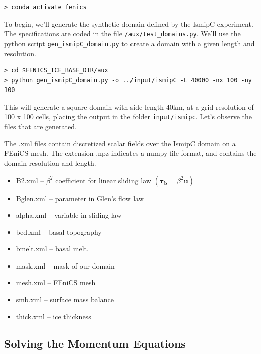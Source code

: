 \documentclass[11pt, reqno, nocenter]{article}
\begin{document}
\begin{verbatim}
> conda activate fenics 
\end{verbatim}

To begin, we'll generate the synthetic domain defined by the IsmipC experiment. The specifications are coded in the file {\tt /aux/test\_domains.py}. We'll use the python script {\tt gen\_ismipC\_domain.py} to create a domain with a given length and resolution.

\begin{verbatim}
> cd $FENICS_ICE_BASE_DIR/aux 
> python gen_ismipC_domain.py -o ../input/ismipC -L 40000 -nx 100 -ny 100 
\end{verbatim}

This will generate a square domain with side-length 40\si{\kilo\metre}, at a grid resolution of 100 x 100 cells, placing the output in the folder {\tt input/ismipc}.
Let's observe the files that are generated.


The .xml files contain discretized scalar fields over the IsmipC domain on a FEniCS mesh. The extension .npz indicates a numpy file format, and contains the domain resolution and length.

\begin{itemize}
\item B2.xml -- $\beta^2$ coefficient for linear sliding law $( = \beta^2 )$
\item  Bglen.xml -- parameter in Glen's flow law
\item alpha.xml -- variable in sliding law 
\item bed.xml -- basal topography
\item bmelt.xml -- basal melt. 
\item mask.xml -- mask of our domain
\item mesh.xml -- FEniCS mesh
\item smb.xml -- surface mass balance
\item thick.xml -- ice thickness

\end{itemize}

\subsection{Solving the Momentum Equations}
\end{document}
